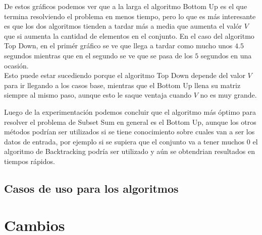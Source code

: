 \documentclass[a4paper]{article}
\begin{document}
De estos gráficos podemos ver que a la larga el algoritmo Bottom Up es el que termina resolviendo el problema en menos tiempo, pero lo que es más interesante es que los dos algoritmos tienden a tardar más a media que aumenta el valór $V$ que si aumenta la cantidad de elementos en el conjunto. En el caso del algoritmo Top Down, en el primér gráfico se ve que llega a tardar como mucho unos $4.5$ segundos mientras que en el segundo se ve que se pasa de los $5$ segundos en una ocasión.
\\
Esto puede estar sucediendo porque el algoritmo Top Down depende del valor $V$ para ir llegando a los casos base, mientras que el Bottom Up llena su matriz siempre al mismo paso, aunque esto le saque ventaja cuando $V$ no es muy grande.

Luego de la experimentación podemos concluir que el algoritmo más óptimo para resolver el problema de Subset Sum en general es el Bottom Up, aunque los otros métodos podrían ser utilizados si se tiene conocimiento sobre cuales van a ser los datos de entrada, por ejemplo si se supiera que el conjunto va a tener muchos 0 el algoritmo de Backtracking podría ser utilizado y aún se obtendrian resultados en tiempos rápidos.

\subsection{Casos de uso para los algoritmos}




%

\section{Cambios}

\end{document}
